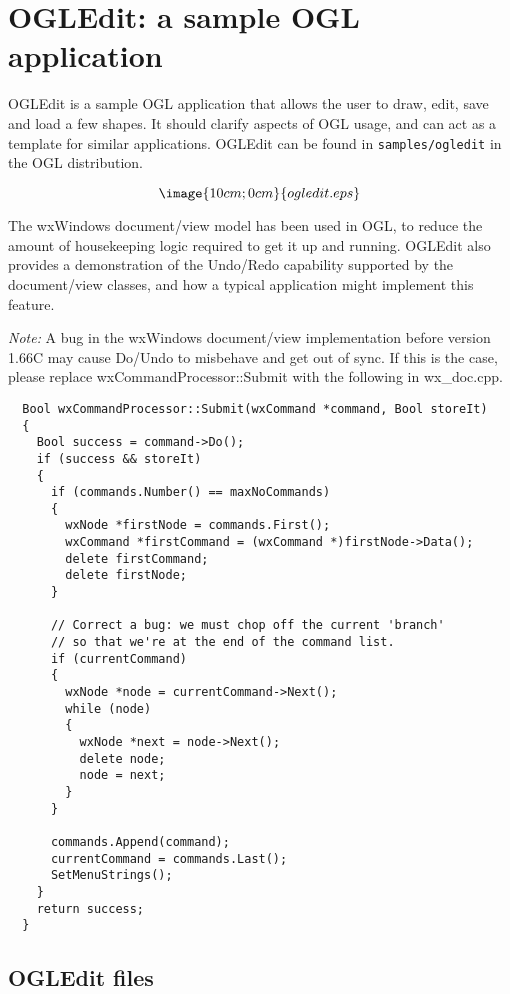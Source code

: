 \chapter{OGLEdit: a sample OGL application}\label{ogledit}%
%
\setfooter{\thepage}{}{}{}{}{\thepage}

OGLEdit is a sample OGL application that allows the user to draw, edit,
save and load a few shapes. It should clarify aspects of OGL usage, and
can act as a template for similar applications. OGLEdit can be found in\rtfsp
{\tt samples/ogledit} in the OGL distribution.

$$\image{10cm;0cm}{ogledit.eps}$$\par

The wxWindows document/view model has been used in OGL, to reduce the amount of
housekeeping logic required to get it up and running. OGLEdit also provides
a demonstration of the Undo/Redo capability supported by the document/view classes,
and how a typical application might implement this feature.

{\it Note:} A bug in the wxWindows document/view implementation before
version 1.66C may cause Do/Undo to misbehave and get out of sync. If this is the case,
please replace wxCommandProcessor::Submit with the following in wx\_doc.cpp.

{\small
\begin{verbatim}
  Bool wxCommandProcessor::Submit(wxCommand *command, Bool storeIt)
  {
    Bool success = command->Do();
    if (success && storeIt)
    {
      if (commands.Number() == maxNoCommands)
      {
        wxNode *firstNode = commands.First();
        wxCommand *firstCommand = (wxCommand *)firstNode->Data();
        delete firstCommand;
        delete firstNode;
      }

      // Correct a bug: we must chop off the current 'branch'
      // so that we're at the end of the command list.
      if (currentCommand)
      {
        wxNode *node = currentCommand->Next();
        while (node)
        {
          wxNode *next = node->Next();
          delete node;
          node = next;
        }
      }
    
      commands.Append(command);
      currentCommand = commands.Last();
      SetMenuStrings();
    }
    return success;
  }
\end{verbatim}
}

\section{OGLEdit files}

